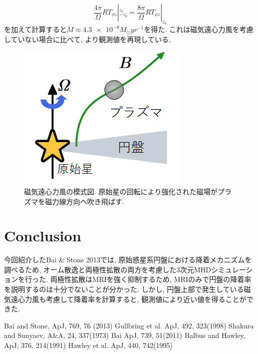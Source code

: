 \documentclass[a4paper,10pt,oneside,twocolumn,notitlepage,final,dvipdfmx]{jarticle}
\begin{document}
\begin{equation}
  \frac{4\pi}{\Omega} R T_{\phi z}|_{-z_b}^{z_b} = \frac{8\pi}{\Omega} RT_{\phi z}|_{z_b}
\end{equation}
を加えて計算すると\( \dot{M} \approx \num{4.3e-8} M_{\odot} \si{yr^{-1}} \)を得た. これは磁気遠心力風を考慮していない場合に比べて, より観測値を再現している. 
\begin{figure}\label{fig:magnetocentrifugal_wind}
  \centering
  \includegraphics[width=1\linewidth]{./contents/magnetocentrifugal_wind.png}
  \caption{磁気遠心力風の模式図. 原始星の回転により強化された磁場がプラズマを磁力線方向へ吹き飛ばす.}
\end{figure}
\section{Conclusion}
 今回紹介したBai \& Stone 2013では, 原始惑星系円盤における降着メカニズムを調べるため, オーム散逸と両極性拡散の両方を考慮した3次元MHDシミュレーションを行った. 両極性拡散はMRIを強く抑制するため, MRIのみで円盤の降着率を説明するのは十分でないことが分かった. しかし, 円盤上部で発生している磁気遠心力風も考慮して降着率を計算すると, 観測値により近い値を得ることができた. 
\begin{thebibliography}{9}
  Bai and Stone,
  ApJ, 769, 76 (2013)
  Gullbring et al.
  ApJ, 492, 323(1998)
  Shakura and Sunyaev,
  A\&A, 24, 337(1973)
  Bai
  ApJ, 739, 51(2011)
  Balbus and Hawley,
  ApJ, 376, 214(1991)
  Hawley et al.
  ApJ, 440, 742(1995)
\end{thebibliography}
\end{document}
